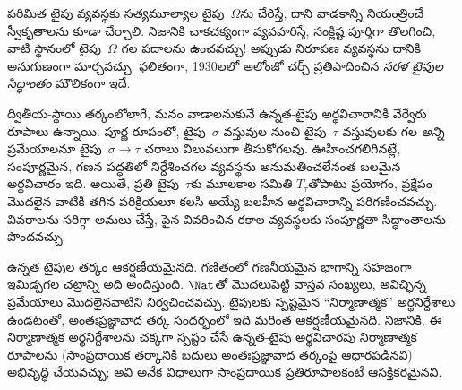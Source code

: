 \documentclass[../../../include/open-logic-section]{subfiles}
\begin{document}
పరిమిత టైపు వ్యవస్థకు సత్యమూల్యాల టైపు~$\Omega$ను చేరిస్తే, దాని
వాడకాన్ని నియంత్రించే స్వీకృతాలను కూడా చేర్చాలి. నిజానికి చాకచక్యంగా
వ్యవహరిస్తే, సంక్లిష్ట  పూర్తిగా తొలగించి, వాటి స్థానంలో
టైపు~$\Omega$ గల పదాలను ఉంచవచ్చు!{} అప్పుడు నిరూపణ వ్యవస్థను దానికి
అనుగుణంగా మార్చవచ్చు. ఫలితంగా, 1930లలో అలోంజో చర్చ్ ప్రతిపాదించిన
\emph{సరళ టైపుల సిద్ధాంతం} మౌలికంగా ఇదే.

ద్వితీయ-స్థాయి తర్కంలోలాగే, మనం వాడాలనుకునే ఉన్నత-టైపు
అర్థవిచారానికి వేర్వేరు రూపాలు ఉన్నాయి. పూర్ణ రూపంలో,
టైపు~$\sigma$ వస్తువుల నుంచి టైపు~$\tau$ వస్తువులకు గల
\emph{అన్ని} ప్రమేయాలనూ టైపు~$\sigma \to \tau$ చరాలు
విలువలుగా తీసుకోగలవు. ఊహించగలిగినట్లే, సంపూర్ణమైన, గణన పద్ధతిలో నిర్దేశించగల
 వ్యవస్థను అనుమతించలేనంత బలమైన అర్థవిచారం ఇది. అయితే,
ప్రతి టైపు~$\tau$కు మూలకాల సమితి $T_\tau$తోపాటు ప్రయోగం,
ప్రక్షేపం మొదలైన వాటికి తగిన పరిక్రియలూ కలసి  అయ్యే
బలహీన అర్థవిచారాన్ని పరిగణించవచ్చు. వివరాలను సరిగ్గా అమలు చేస్తే,
పైన వివరించిన రకాల  వ్యవస్థలకు సంపూర్ణతా సిద్ధాంతాలను
పొందవచ్చు.

ఉన్నత టైపుల తర్కం ఆకర్షణీయమైనది. గణితంలో గణనీయమైన భాగాన్ని
సహజంగా ఇమిడ్చగల చట్రాన్ని అది అందిస్తుంది. $\Nat$తో మొదలుపెట్టి
వాస్తవ సంఖ్యలు, అవిచ్ఛిన్న ప్రమేయాలు మొదలైనవాటిని నిర్వచించవచ్చు.
టైపులకు స్పష్టమైన ``నిర్మాణాత్మక'' అర్థనిర్దేశాలు ఉండటంతో,
అంతఃప్రజ్ఞావాద తర్క సందర్భంలో ఇది మరింత ఆకర్షణీయమైనది. నిజానికి,
ఈ నిర్మాణాత్మక అర్థనిర్దేశాలను చక్కగా స్పష్టం చేసే ఉన్నత-టైపు
అర్థవిచారపు నిర్మాణాత్మక రూపాలను (సాంప్రదాయిక తర్కానికి బదులు
అంతఃప్రజ్ఞావాద తర్కంపై ఆధారపడినవి) అభివృద్ధి చేయవచ్చు; అవి అనేక
విధాలుగా సాంప్రదాయిక ప్రతిరూపాలకంటే ఆసక్తికరమైనవి.
\end{document}
